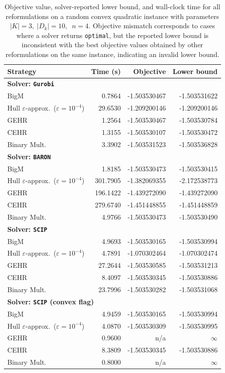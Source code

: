 \documentclass[11pt]{article}
\begin{document}
\begin{table}[t]
\centering
\caption{Objective value, solver-reported lower bound, and wall-clock time for all reformulations on a random convex quadratic instance with parameters 
\( |K| = 3,\; |D_k| = 10,\; \; n = 4 \). Objective mismatch corresponds to cases where a solver returns \texttt{optimal}, but the reported lower bound is inconsistent with the best objective values obtained by other reformulations on the same instance, indicating an invalid lower bound.}
\label{tab:obj-mismatch-all}
\footnotesize
\setlength{\tabcolsep}{6pt}
\begin{tabular}{lrrr}
\toprule
\textbf{Strategy} & \textbf{Time (s)} & \textbf{Objective} & \textbf{Lower bound} \\
\midrule
\multicolumn{4}{l}{\textbf{Solver: \texttt{Gurobi}}} \\
BigM & 0.7864  & -1.503530467 & -1.503531622 \\
Hull $\varepsilon$-approx.\ ($\varepsilon=10^{-4}$) & 29.6530 & -1.209200146 & -1.209200146 \\
GEHR & 1.2564  & -1.503530467 & -1.503530784 \\
CEHR & 1.3155  & -1.503530107 & -1.503530472 \\
Binary Mult. & 3.3902  & -1.503531523 & -1.503536828 \\
\midrule
\multicolumn{4}{l}{\textbf{Solver: \texttt{BARON}}} \\
BigM & 1.8185  & -1.503530473 & -1.503530415 \\
Hull $\varepsilon$-approx.\ ($\varepsilon=10^{-4}$) & 301.7905 & -1.382069355 & -2.172538773 \\
GEHR & 196.1422 & -1.439272090 & -1.439272090 \\
CEHR & 279.6740 & -1.451448855 & -1.451448859 \\
Binary Mult. & 4.9766  & -1.503530473 & -1.503530490 \\
\midrule
\multicolumn{4}{l}{\textbf{Solver: \texttt{SCIP}}} \\
BigM & 4.9693  & -1.503530165 & -1.503530994 \\
Hull $\varepsilon$-approx.\ ($\varepsilon=10^{-4}$) & 4.7891  & -1.070302464 & -1.070302474 \\
GEHR & 27.2644 & -1.503530585 & -1.503531213 \\
CEHR & 8.4097  & -1.503530345 & -1.503530886 \\
Binary Mult. & 23.7996 & -1.503530282 & -1.503531068 \\
\midrule
\multicolumn{4}{l}{\textbf{Solver: \texttt{SCIP} (convex flag)}} \\
BigM & 4.9459  & -1.503530165 & -1.503530994 \\
Hull $\varepsilon$-approx.\ ($\varepsilon=10^{-4}$) & 4.0870  & -1.503530309 & -1.503530995 \\
GEHR & 0.9600  & n/a & $\infty$ \\
CEHR & 8.3809  & -1.503530345 & -1.503530886 \\
Binary Mult. & 0.8000  & n/a & $\infty$ \\
\bottomrule
\end{tabular}
\end{table}
\end{document}
